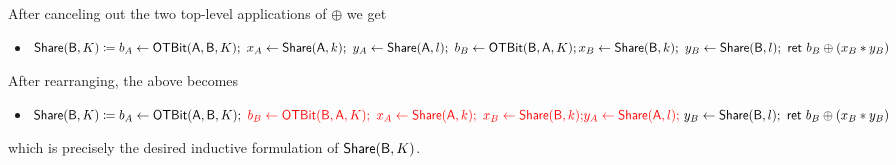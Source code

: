 \begin{itemize}
\begin{itemize}
\end{itemize}
After canceling out the two top-level applications of $\oplus$ we get
\begin{itemize}
\item $\mathsf{Share}(\mathsf{B},K) \coloneqq b_A \leftarrow \mathsf{OTBit}(\mathsf{A},\mathsf{B},K); \ x_A \leftarrow \mathsf{Share}(\mathsf{A},k); \ y_A \leftarrow \mathsf{Share}(\mathsf{A},l); \ b_B \leftarrow \mathsf{OTBit}(\mathsf{B},\mathsf{A},K); \\ x_B \leftarrow \mathsf{Share}(\mathsf{B},k); \ y_B \leftarrow \mathsf{Share}(\mathsf{B},l); \ \mathsf{ret} \ b_B \oplus (x_B * y_B)$
\end{itemize}
After rearranging, the above becomes
\begin{itemize}
\item $\mathsf{Share}(\mathsf{B},K) \coloneqq b_A \leftarrow \mathsf{OTBit}(\mathsf{A},\mathsf{B},K); \ {\color{red} b_B \leftarrow \mathsf{OTBit}(\mathsf{B},\mathsf{A},K); \ x_A \leftarrow \mathsf{Share}(\mathsf{A},k); \ x_B \leftarrow \mathsf{Share}(\mathsf{B},k);} \\ {\color{red} y_A \leftarrow \mathsf{Share}(\mathsf{A},l); \ } y_B \leftarrow \mathsf{Share}(\mathsf{B},l); \ \mathsf{ret} \ b_B \oplus (x_B * y_B)$
\end{itemize}
which is precisely the desired inductive formulation of $\mathsf{Share}(\mathsf{B},K)$.


\end{itemize}
